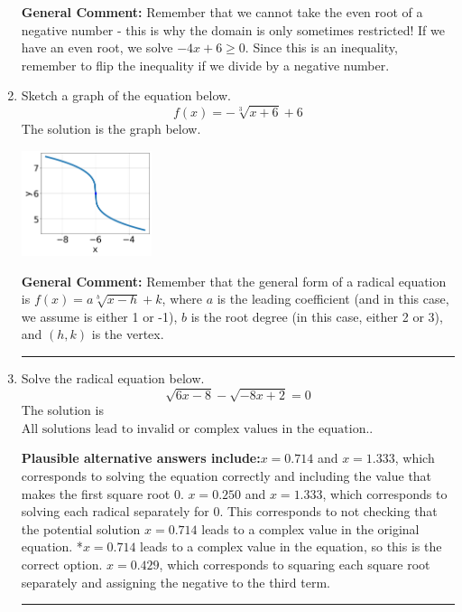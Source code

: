 \documentclass{extbook}[14pt]
\newcommand{\litem}[1]{\item #1

\rule{\textwidth}{0.4pt}}
\begin{document}
\begin{enumerate}
{\textbf{General Comment:} Remember that we cannot take the even root of a negative number - this is why the domain is only sometimes restricted! If we have an even root, we solve $-4 x + 6 \geq 0$. Since this is an inequality, remember to flip the inequality if we divide by a negative number.
}
\litem{
Sketch a graph of the equation below.
\[ f(x) = - \sqrt[3]{x + 6} + 6 \]The solution is the graph below.
    \begin{center}
        \includegraphics[width=0.3\textwidth]{../Figures/radicalEquationToGraphCC.png}
    \end{center}

\textbf{General Comment:} Remember that the general form of a radical equation is $ f(x) = a \sqrt[b]{x - h} + k $, where $a$ is the leading coefficient (and in this case, we assume is either 1 or -1), $b$ is the root degree (in this case, either 2 or 3), and $(h, k)$ is the vertex.
}
\litem{
Solve the radical equation below.
\[ \sqrt{6 x - 8} - \sqrt{-8 x + 2} = 0 \]The solution is \( \text{All solutions lead to invalid or complex values in the equation.} \).\begin{enumerate}[label=\Alph*.]
\textbf{Plausible alternative answers include:}$x = 0.714$ and $x = 1.333$, which corresponds to solving the equation correctly and including the value that makes the first square root 0.
$x = 0.250$ and $x = 1.333$, which corresponds to solving each radical separately for 0.
This corresponds to not checking that the potential solution $x = 0.714$ leads to a complex value in the original equation.
*$x = 0.714$ leads to a complex value in the equation, so this is the correct option.
$x = 0.429$, which corresponds to squaring each square root separately and assigning the negative to the third term.
\end{enumerate}

}
\end{enumerate}
\end{document}
